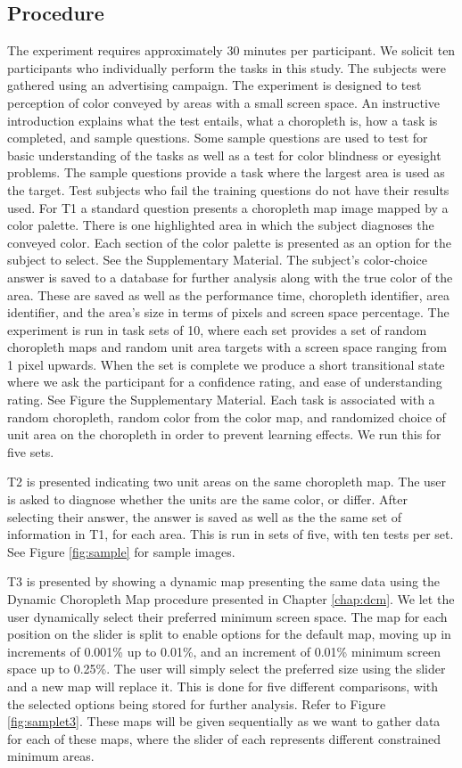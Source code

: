 \subsection{Procedure} \label{sec:process}
The experiment requires approximately 30 minutes per participant. We solicit ten participants who individually perform the tasks in this study. The subjects were gathered using an advertising campaign. The experiment is designed to test perception of color conveyed by areas with a small screen space.  An instructive introduction explains what the test entails, what a choropleth is, how a task is completed, and sample questions. Some sample questions are used to test for basic understanding of the tasks as well as a test for color blindness or eyesight problems. The sample questions provide a task where the largest area is used as the target. Test subjects who fail the training questions do not have their results used. For T1 a standard question presents a choropleth map image mapped by a color palette. There is one highlighted area in which the subject diagnoses the conveyed color. Each section of the color palette is presented as an option for the subject to select. See the Supplementary Material. The subject's color-choice answer is saved to a database for further analysis along with the true color of the area. These are saved as well as the performance time, choropleth identifier, area identifier, and the area's size in terms of pixels and screen space percentage. The experiment is run in task sets of 10, where each set provides a set of random choropleth maps and random unit area targets with a screen space ranging from 1 pixel upwards. When the set is complete we produce a short transitional state where we ask the participant for a confidence rating, and ease of understanding rating. See Figure the Supplementary Material. Each task is associated with a random choropleth, random color from the color map, and randomized choice of unit area on the choropleth in order to prevent learning effects. We run this for five sets.

T2 is presented indicating two unit areas on the same choropleth map. The user is asked to diagnose whether the units are the same color, or differ. After selecting their answer, the answer is saved as well as the the same set of information in T1, for each area. This is run in sets of five, with ten tests per set. See Figure \ref{fig:sample} for sample images.

T3 is presented by showing a dynamic map presenting the same data using the Dynamic Choropleth Map procedure presented in Chapter \ref{chap:dcm}. We let the user dynamically select their preferred minimum screen space. The map for each position on the slider is split to enable options for the default map, moving up in increments of 0.001\% up to 0.01\%, and an increment of 0.01\% minimum screen space up to 0.25\%. The user will simply select the preferred size using the slider and a new map will replace it. This is done for five different comparisons, with the selected options being stored for further analysis. Refer to Figure \ref{fig:samplet3}. These maps will be given sequentially as we want to gather data for each of these maps, where the slider of each represents different constrained minimum areas.

